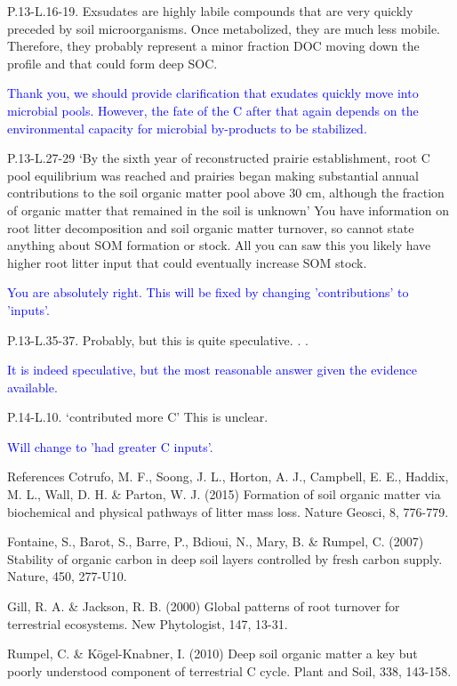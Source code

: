 \documentclass[]{article}
\begin{document}
P.13-L.16-19. Exsudates are highly labile compounds that are very
quickly preceded by soil microorganisms. Once metabolized, they are much
less mobile. Therefore, they probably represent a minor fraction DOC
moving down the profile and that could form deep SOC.

\textcolor{blue}{Thank you, we should provide clarification that exudates quickly move into microbial pools. However, the fate of the C after that again depends on the environmental capacity for microbial by-products to be stabilized.}

P.13-L.27-29 `By the sixth year of reconstructed prairie establishment,
root C pool equilibrium was reached and prairies began making
substantial annual contributions to the soil organic matter pool above
30 cm, although the fraction of organic matter that remained in the soil
is unknown' You have information on root litter decomposition and soil
organic matter turnover, so cannot state anything about SOM formation or
stock. All you can saw this you likely have higher root litter input
that could eventually increase SOM stock.

\textcolor{blue}{You are absolutely right. This will be fixed by changing 'contributions' to 'inputs'.}

P.13-L.35-37. Probably, but this is quite speculative. . .

\textcolor{blue}{It is indeed speculative, but the most reasonable answer given the evidence available.}

P.14-L.10. `contributed more C' This is unclear.

\textcolor{blue}{Will change to 'had greater C inputs'.}

References Cotrufo, M. F., Soong, J. L., Horton, A. J., Campbell, E. E.,
Haddix, M. L., Wall, D. H. \& Parton, W. J. (2015) Formation of soil
organic matter via biochemical and physical pathways of litter mass
loss. Nature Geosci, 8, 776-779.

Fontaine, S., Barot, S., Barre, P., Bdioui, N., Mary, B. \& Rumpel, C.
(2007) Stability of organic carbon in deep soil layers controlled by
fresh carbon supply. Nature, 450, 277-U10.

Gill, R. A. \& Jackson, R. B. (2000) Global patterns of root turnover
for terrestrial ecosystems. New Phytologist, 147, 13-31.

Rumpel, C. \& Kögel-Knabner, I. (2010) Deep soil organic matter a key
but poorly understood component of terrestrial C cycle. Plant and Soil,
338, 143-158.
\end{document}
